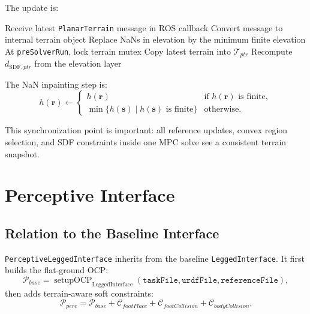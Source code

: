\documentclass[11pt,a4paper]{article}
\begin{document}
The update is:
\begin{algorithm}
	\caption{Terrain Receiver Update}
	\begin{algorithmic}[1]
		\STATE Receive latest \texttt{PlanarTerrain} message in ROS callback
		\STATE Convert message to internal terrain object
		\STATE Replace NaNs in elevation by the minimum finite elevation
		\STATE At \texttt{preSolverRun}, lock terrain mutex
		\STATE Copy latest terrain into $\mathcal{T}_{ptr}$
		\STATE Recompute $d_{\text{SDF},ptr}$ from the elevation layer
	\end{algorithmic}
\end{algorithm}

The NaN inpainting step is:
\begin{equation}
	h(\bm{r})
	\leftarrow
	\begin{cases}
		h(\bm{r}) & \text{if } h(\bm{r}) \text{ is finite},\\
		\min\{h(\bm{s}) \mid h(\bm{s}) \text{ is finite}\} & \text{otherwise}.
	\end{cases}
\end{equation}

This synchronization point is important: all reference updates, convex region selection, and SDF constraints inside one MPC solve see a consistent terrain snapshot.


\section{Perceptive Interface}

\subsection{Relation to the Baseline Interface}

\texttt{PerceptiveLeggedInterface} inherits from the baseline \texttt{LeggedInterface}. It first builds the flat-ground OCP:
\begin{equation}
	\mathcal{P}_{base}
	=
	\operatorname{setupOCP}_{\text{LeggedInterface}}(\texttt{taskFile},\texttt{urdfFile},\texttt{referenceFile}),
\end{equation}
then adds terrain-aware soft constraints:
\begin{equation}
	\mathcal{P}_{perc}
	=
	\mathcal{P}_{base}
	+
	\mathcal{C}_{footPlace}
	+
	\mathcal{C}_{footCollision}
	+
	\mathcal{C}_{bodyCollision}.
\end{equation}
\end{document}
